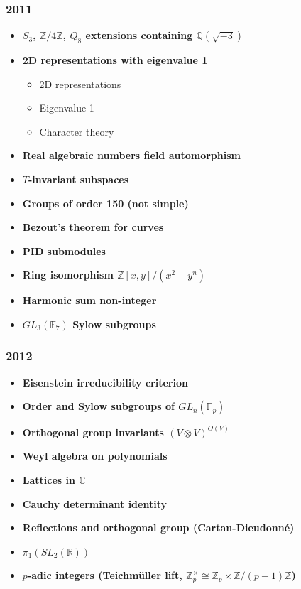 \subsubsection*{2011}
\begin{itemize}
    \item \textbf{$S_3$, $\mathbb{Z}/4\mathbb{Z}$, $Q_8$ extensions containing $\mathbb{Q}(\sqrt{-3})$}
    \item \textbf{2D representations with eigenvalue 1}
        \begin{itemize}
            \item 2D representations
            \item Eigenvalue 1
            \item Character theory
        \end{itemize}
    \item \textbf{Real algebraic numbers field automorphism}
    \item \textbf{$T$-invariant subspaces}
    \item \textbf{Groups of order 150 (not simple)}
    \item \textbf{Bezout's theorem for curves}
    \item \textbf{PID submodules}
    \item \textbf{Ring isomorphism $\mathbb{Z}[x,y]/(x^2-y^n)$}
    \item \textbf{Harmonic sum non-integer}
    \item \textbf{$GL_3(\mathbb{F}_7)$ Sylow subgroups}
\end{itemize}

\subsubsection*{2012}
\begin{itemize}
    \item \textbf{Eisenstein irreducibility criterion}
    \item \textbf{Order and Sylow subgroups of $GL_n(\mathbb{F}_p)$}
    \item \textbf{Orthogonal group invariants $(V \otimes V)^{O(V)}$}
    \item \textbf{Weyl algebra on polynomials}
    \item \textbf{Lattices in $\mathbb{C}$}
    \item \textbf{Cauchy determinant identity}
    \item \textbf{Reflections and orthogonal group (Cartan-Dieudonn\'e)}
    \item \textbf{$\pi_1(SL_2(\mathbb{R}))$}
    \item \textbf{$p$-adic integers (Teichm\"uller lift, $\mathbb{Z}_p^\times \cong \mathbb{Z}_p \times \mathbb{Z}/(p-1)\mathbb{Z}$)}
\end{itemize}


